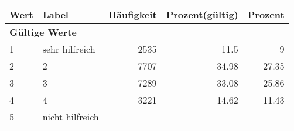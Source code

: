      \begin{longtable}{lXrrr}
     \toprule
     \textbf{Wert} & \textbf{Label} & \textbf{Häufigkeit} & \textbf{Prozent(gültig)} & \textbf{Prozent} \\
     \endhead
     \midrule
     \multicolumn{5}{l}{\textbf{Gültige Werte}}\\

     1 &
     \multicolumn{1}{X}{ sehr hilfreich   } &


       \num{2535} &
       \num[round-mode=places,round-precision=2]{11,5} &
         \num[round-mode=places,round-precision=2]{9} \\

     2 &
     \multicolumn{1}{X}{ 2   } &


       \num{7707} &
       \num[round-mode=places,round-precision=2]{34,98} &
         \num[round-mode=places,round-precision=2]{27,35} \\

     3 &
     \multicolumn{1}{X}{ 3   } &


       \num{7289} &
       \num[round-mode=places,round-precision=2]{33,08} &
         \num[round-mode=places,round-precision=2]{25,86} \\

     4 &
     \multicolumn{1}{X}{ 4   } &


       \num{3221} &
       \num[round-mode=places,round-precision=2]{14,62} &
         \num[round-mode=places,round-precision=2]{11,43} \\

     5 &
     \multicolumn{1}{X}{ nicht hilfreich   } &



\end{longtable}
